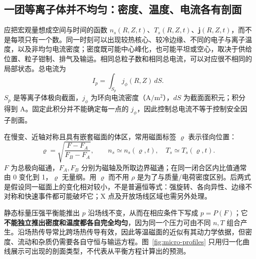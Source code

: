 \documentclass[12pt,fontset=none]{ctexart}
\numberwithin{equation}{section}
\numberwithin{table}{section}
\numberwithin{figure}{section}
\begin{document}
\subsection{一团等离子体并不均匀：密度、温度、电流各有剖面}\label{sec:micro-profiles}

应把宏观量想成空间与时间的函数 $n_s(R,Z,t)$、$T_s(R,Z,t)$、$\bm j(R,Z,t)$，而不是每项只有一个数。同一时刻可以出现较热核心、较冷边缘、不同的电子与离子温度，以及非均匀电流密度；密度既可能中心峰化，也可能平坦或空心，取决于供给位置、粒子钳制、排气及输运。相同总粒子数和相同总电流，可以对应很不相同的局部状态。总电流为
\begin{equation}\label{eq:micro-profile-current}
 I_p=\int_{S_p}j_\phi(R,Z)\,dS.
\end{equation}
$S_p$ 是等离子体极向截面，$j_\phi$ 为环向电流密度（$\mathrm{A/m^2}$），$dS$ 为截面面积元；积分得到 A。固定此积分并不能确定每一点的 $j_\phi$，因此控制总电流不等于控制安全因子剖面。

在慢变、近轴对称且具有嵌套磁面的体区，常用磁面标签 $\varrho$ 表示径向位置：
\begin{equation}\label{eq:micro-fluxlabel}
 \varrho=\sqrt{\frac{F-F_A}{F_B-F_A}},\qquad
 n_s\simeq n_s(\varrho,t),\quad T_s\simeq T_s(\varrho,t).
\end{equation}
$F$ 为总极向磁通，$F_A,F_B$ 分别为磁轴及所取边界磁通；在同一闭合区内比值通常由 0 变化到 1，$\varrho$ 无量纲。用 $\varrho$ 而不用 $\rho$ 是为了与质量/电荷密度区别。后两式是假设同一磁面上的变化相对较小，不是普遍恒等式：强旋转、各向异性、边缘不对称和快速事件都可能破坏它；X 点及开放场线区域也需另外处理。

静态标量压强平衡能推出 $p$ 沿场线不变，从而在相应条件下写成 $p=P(F)$；它\textbf{不能独立推出密度和温度都各自完全均匀}，因为同一个压力可由不同 $n,T$ 组合产生。沿场热传导常比跨场热传导有效，因此等温磁面的近似有其动力学依据，但密度、流动和杂质仍需要各自守恒与输运方程。图~\ref{fig:micro-profiles} 只用归一化曲线展示可出现的剖面类型，不代表从平衡方程计算出的预测。
\end{document}
